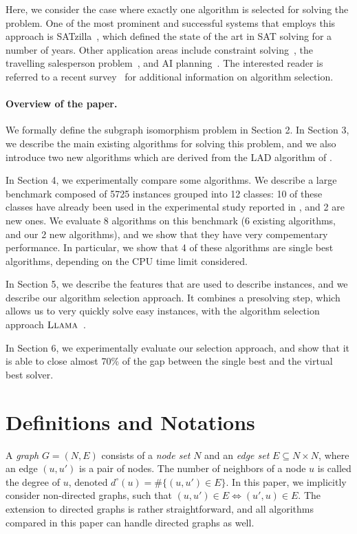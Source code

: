\documentclass{llncs}
\newcommand{\LLAMA}{$\textsc{Llama}$\xspace}
\begin{document}
Here, we consider the case where exactly one algorithm is selected for solving the problem. One of
the most prominent and successful systems that employs this approach is
SATzilla~\cite{xu_satzilla_2008}, which defined the state of the art in SAT solving for a number of
years. Other application areas include constraint solving~\cite{omahony_using_2008}, the travelling
salesperson problem~\cite{kotthoff_improving_2015}, and AI planning~\cite{seipp_learning_2012}.
The interested reader is referred to a recent survey~\cite{kotthoff_algorithm_2014} for additional
information on algorithm selection.

\paragraph{Overview of the paper.}
We formally define the subgraph isomorphism problem in Section 2. 
In Section 3, we describe the main existing algorithms for solving this problem, and we also introduce two new algorithms which are derived from the LAD algorithm of \cite{Solnon:2010}. 

In Section 4, we experimentally compare some algorithms. We describe a large benchmark composed of 5725 instances grouped into 12 classes: 10 of these classes have already been used in the experimental study reported in  \cite{McCreesh:2015}, and 2 are new ones. We evaluate 8 algorithms on this benchmark (6 existing algorithms, and our 2 new algorithms), and we show that they have very compementary performance. In particular, we show that 4 of these algorithms are single best algorithms, depending on the CPU time limit considered. 

In Section 5, we describe the features that are used to describe instances, and we describe our algorithm selection approach. It combines a presolving step, which allows us to very quickly solve easy instances, with the algorithm selection approach \LLAMA~\cite{kotthoff_llama_2013}. 

In Section 6, we experimentally evaluate our selection approach, and show that it is able to close almost 70\% of the gap between the single best and the virtual best solver.



\section{Definitions and Notations}

A \emph{graph} $G=(N,E)$ consists of a \emph{node set} $N$ and an \emph{edge set} $E \subseteq N
\times N$, where an edge $(u,u')$ is a pair of nodes. The number of neighbors of a node $u$ is
called the degree of $u$, denoted $d^\circ(u)=\#\{ (u,u')\in E\}$. In this paper, we implicitly consider
non-directed graphs, such that $(u,u')\in E\Leftrightarrow (u',u)\in E$. The extension to directed
graphs is rather straightforward, and all algorithms compared in this paper can handle directed
graphs as well.
\end{document}
